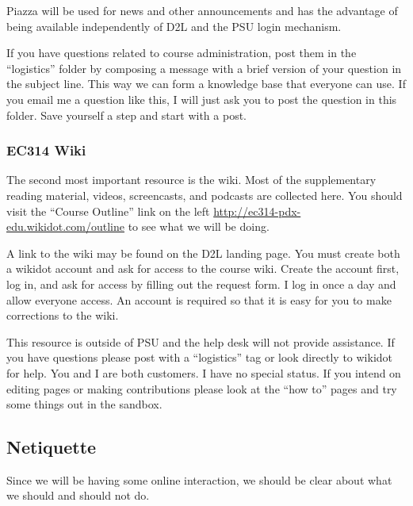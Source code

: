 \documentclass[letterpaper,10pt]{article}
\begin{document}
  


Piazza will be used for news and other announcements and has the advantage of being available independently of D2L and the PSU login mechanism.  

If you have questions related to course administration, post them in
the ``logistics'' folder by composing a message with a brief version of your question in the subject line. This way we can form a knowledge base that everyone can use.  If you email me a question like this, I will just ask you to post the question in this folder.  Save yourself a step and start with a post.


\subsubsection{EC314 Wiki}
The second most important resource is the wiki.  Most of the
supplementary reading material, videos, screencasts, and podcasts are
collected here. You should visit the ``Course Outline'' link on the
left \url{http://ec314-pdx-edu.wikidot.com/outline} to see what we will be
doing.

A link to the wiki may be found on the D2L landing page.  You must create both a wikidot account and ask for access to the course wiki.  Create the account first, log in, and ask for access by filling out the request form.  I log in once a day and allow everyone access.  An account is required so that it is easy for you to make corrections to the wiki.

This resource is outside of PSU and the help desk will not provide
assistance.  If you have questions please post with a  
``logistics'' tag or look directly to wikidot
for help.  You and I are both customers. I have no special status.
If you intend on editing pages or making contributions please look at
the ``how to'' pages and try some things out in the sandbox.

\subsection{Netiquette}
Since we will be having some online interaction, we should be clear
about what we should and should not do.
\end{document}
